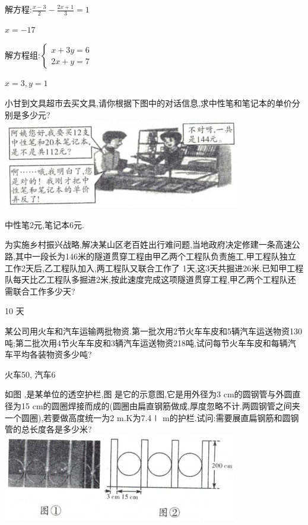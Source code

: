 \documentclass[cn,blue,12pt]{elegantbook}
\begin{document}
\begin{shiti}
\begin{shiti}[resume]
\item 解方程:\(\frac{x-3}{2}-\frac{2x+1}{3}=1\)
\begin{solution}
        \(x=-17\)
\end{solution}
\item 解方程组:\(\begin{cases} x+3y=6\\ 2x+y=7\end{cases}\)
\begin{solution}
        \(x=3,y=1\)
\end{solution}
\item 小甘到文具超市去买文具,请你根据下图中的对话信息,求中性笔和笔记本的单价分别是多少元?\\
\includegraphics[width=0.7\linewidth]{pic/20200531008.png}
\begin{solution}
    中性笔2元,笔记本6元.
\end{solution}
\item 为实施乡村振兴战略,解决某山区老百姓出行难问题,当地政府决定修建一条高速公路,其中一段长为146米的隧道贯穿工程由甲乙两个工程队负责施工,甲工程队独立工作2天后,乙工程队加入,两工程队又联合工作了 1天,这3天共掘进26米.已知甲工程队每天比乙工程队多掘进2米,按此速度完成这项隧道贯穿工程,甲乙两个工程队还需联合工作多少天?
\begin{solution}
        10 天
\end{solution}
\item  某公司用火车和汽车运输两批物资.第一批次用2节火车车皮和5辆汽车运送物资130吨;第二批次用4节火车车皮和3辆汽车运送物资218吨,试问每节火车车皮和每辆汽车平均各装物资多少吨?
\begin{solution}
        火车50, 汽车6
\end{solution}
\item 如图 ,是某单位的透空护栏,图 是它的示意图,它是用外径为3 cm的圆钢管与外圆直径为15 cm的圆圈焊接而成的(圆圈由扁直钢筋做成,厚度忽略不计.两圆钢管之间夹一个圆圈),若要做高度统一为2 m.K为7.4∣ m的护栏.试问:需要展直扁钢筋和圆钢管的总长度各是多少米?\\
\includegraphics[width=0.6\linewidth]{pic/20200531009.png}

\end{shiti}
\end{shiti}
\end{document}
